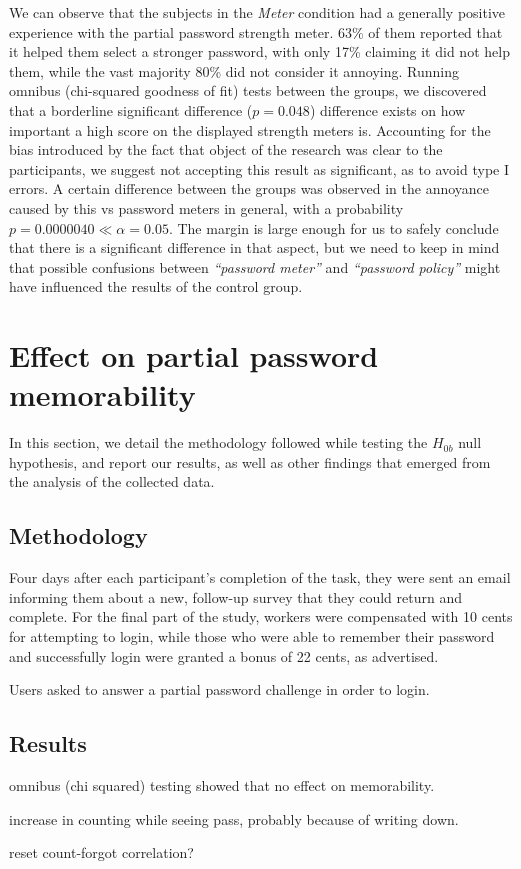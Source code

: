     We can observe that the subjects in the \emph{Meter} condition had a generally positive experience with the partial password strength meter. 63\% of them reported that it helped them select a stronger password, with only 17\% claiming it did not help them, while the vast majority 80\% did not consider it annoying. Running omnibus (chi-squared goodness of fit) tests between the groups, we discovered that a borderline significant difference ($p=0.048$) difference exists on how important a high score on the displayed strength meters is. Accounting for the bias introduced by the fact that object of the research was clear to the participants, we suggest not accepting this result as significant, as to avoid type I errors. A certain difference between the groups was observed in the annoyance caused by this vs password meters in general, with a probability $p=0.0000040 \ll \alpha = 0.05$. The margin is large enough for us to safely conclude that there is a significant difference in that aspect, but we need to keep in mind that possible confusions between \emph{``password meter''} and \emph{``password policy''} might have influenced the results of the control group.

\section{Effect on partial password memorability}
  \label{sec:memorability}
  In this section, we detail the methodology followed while testing the $H_{0b}$ null hypothesis, and report our results, as well as other findings that emerged from the analysis of the collected data.

  \subsection{Methodology}
    \label{ssec:memorability_setup}
    Four days after each participant's completion of the task, they were sent an email informing them about a new, follow-up survey that they could return and complete. For the final part of the study, workers were compensated with 10 cents for attempting to login, while those who were able to remember their password and successfully login were granted a bonus of 22 cents, as advertised.

    Users asked to answer a partial password challenge in order to login.

  \subsection{Results}
    \label{ssec:memorability_results}
    omnibus (chi squared) testing showed that no effect on memorability.

    increase in counting while seeing pass, probably because of writing down.

    reset count-forgot correlation?
